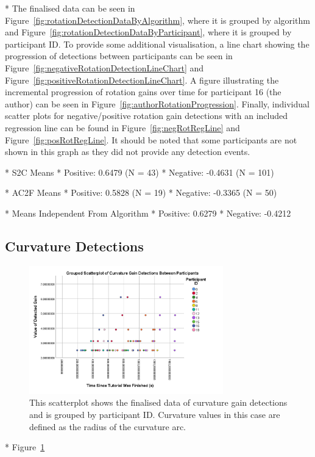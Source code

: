 * The finalised data can be seen in Figure~\ref{fig:rotationDetectionDataByAlgorithm}, where it is grouped by algorithm and Figure~\ref{fig:rotationDetectionDataByParticipant}, where it is grouped by participant ID. To provide some additional visualisation, a line chart showing the progression of detections between participants can be seen in Figure~\ref{fig:negativeRotationDetectionLineChart} and Figure~\ref{fig:positiveRotationDetectionLineChart}. A figure illustrating the incremental progression of rotation gains over time for participant 16 (the author) can be seen in Figure~\ref{fig:authorRotationProgression}. Finally, individual scatter plots for negative/positive rotation gain detections with an included regression line can be found in Figure~\ref{fig:negRotRegLine} and Figure~\ref{fig:posRotRegLine}. It should be noted that some participants are not shown in this graph as they did not provide any detection events. 

* S2C Means
   * Positive: 0.6479 (N = 43)
   * Negative: -0.4631 (N = 101)

* AC2F Means
   * Positive: 0.5828 (N = 19)
   * Negative: -0.3365 (N = 50)
   
* Means Independent From Algorithm
   * Positive: 0.6279
   * Negative: -0.4212

\subsection{Curvature Detections}
\begin{figure}[tbph]
    \centering
    \includegraphics[width=0.75\textwidth]{figures/graphs/CurvatureDetectionScatter.png}
    \caption[Finalised Detection Scatterplot For Curvature Gains, Grouped by Participant ID]{This scatterplot shows the finalised data of curvature gain detections and is grouped by participant ID. Curvature values in this case are defined as the radius of the curvature arc.}
    \label{fig:curvatureDetectionData}
\end{figure}
* Figure~\ref{fig:curvatureDetectionData}


